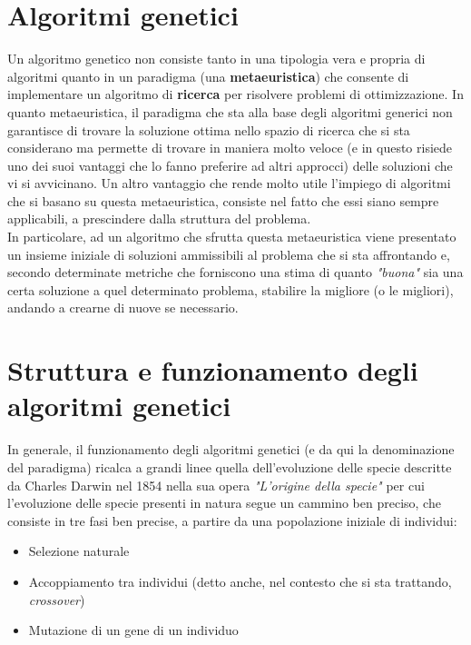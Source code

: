 \section{Algoritmi genetici}
    Un algoritmo genetico non consiste tanto in una tipologia vera e propria di algoritmi quanto in un paradigma (una \textbf{metaeuristica}) che consente di implementare un algoritmo di \textbf{ricerca} per risolvere problemi di ottimizzazione. In quanto metaeuristica, il paradigma che sta alla base degli algoritmi generici non garantisce di trovare la soluzione ottima nello spazio di ricerca che si sta considerano ma permette di trovare in maniera molto veloce (e in questo risiede uno dei suoi vantaggi che lo fanno preferire ad altri approcci) delle soluzioni che vi si avvicinano. Un altro vantaggio che rende molto utile l'impiego di algoritmi che si basano su questa metaeuristica, consiste nel fatto che essi siano sempre applicabili, a prescindere dalla struttura del problema. \\
    In particolare, ad un algoritmo che sfrutta questa metaeuristica viene presentato un insieme iniziale di soluzioni ammissibili al problema che si sta affrontando e, secondo determinate metriche che forniscono una stima di quanto \textit{"buona"} sia una certa soluzione a quel determinato problema, stabilire la migliore (o le migliori), andando a crearne di nuove se necessario.

\section{Struttura e funzionamento degli algoritmi genetici}
    In generale, il funzionamento degli algoritmi genetici (e da qui la denominazione del paradigma) ricalca a grandi linee quella dell'evoluzione delle specie descritte da Charles Darwin nel 1854 nella sua opera \textit{"L'origine della specie"} per cui l'evoluzione delle specie presenti in natura segue un cammino ben preciso, che consiste in tre fasi ben precise, a partire da una popolazione iniziale di individui:

    \begin{itemize}
        \item Selezione naturale
        \item Accoppiamento tra individui (detto anche, nel contesto che si sta trattando, \textit{crossover})
        \item Mutazione di un gene di un individuo
    \end{itemize}


